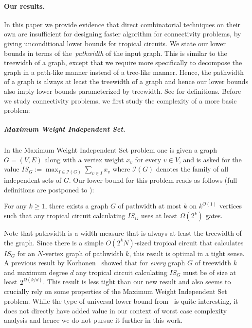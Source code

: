 \paragraph{Our results.}
In this paper we provide evidence that direct combinatorial techniques on their own are insufficient for designing faster algorithm for connectivity problems, by giving unconditional lower bounds for tropical circuits. We state our lower bounds in terms of the~\emph{pathwidth} of the input graph. This is similar to the treewidth of a graph, except that we require more specifically to decompose the graph in a path-like manner instead of a tree-like manner. Hence, the pathwidth of a graph is always at least the treewidth of a graph and hence our lower bounds also imply lower bounds parameterized by treewidth. See  for definitions.
Before we study connectivity problems, we first study the complexity of a more basic problem:

\subparagraph{Maximum Weight Independent Set.}
In the Maximum Weight Independent Set problem one is given a graph $G=(V,E)$ along with a vertex weight $x_v$ for every $v \in V$, and is asked for the value $IS_G:=\max_{I \in \mathcal{I}(G)}\sum_{v \in I}x_v$ where $\mathcal{I}(G)$ denotes the family of all independent sets of $G$. Our lower bound for this problem reads as follows (full definitions are postponed to ):

\begin{theorem}\label{thm:main_is}
    For any $k \geq 1$, there exists a graph $G$ of pathwidth at most $k$ on $k^{O(1)}$ vertices such that any tropical circuit calculating $IS_G$ uses at least $\Omega(2^k)$ gates.
\end{theorem}
Note that pathwidth is a width measure that is always at least the treewidth of the graph.
Since there is a simple $O(2^{k}N)$-sized tropical circuit that calculates $IS_G$ for an $N$-vertex graph of pathwidth $k$, this result is optimal in a tight sense.
A previous result by Korhonen~\cite{Korhonen21} showed that for \emph{every} graph $G$ of treewidth $k$ and maximum degree $d$ any tropical circuit calculating $IS_G$ must be of size at least $2^{\Omega(k/d)}$.
This result is less tight than our new result and also seems to crucially rely on some properties of the Maximum Weight Independent Set problem. While the type of universal lower bound from~\cite{Korhonen21} is quite interesting, it does not directly have added value in our context of worst case complexity analysis and hence we do not pursue it further in this work.

